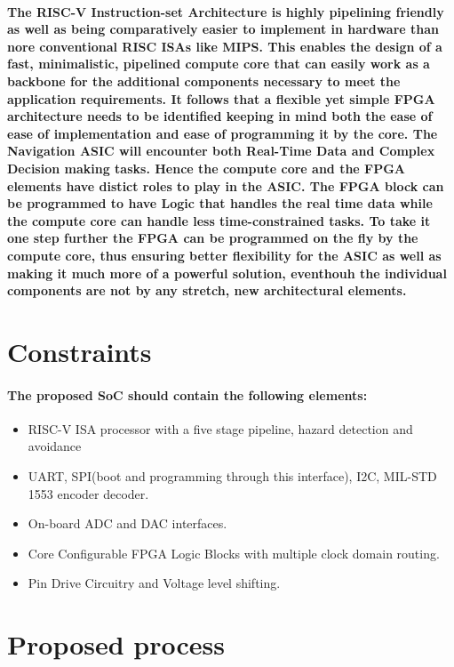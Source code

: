 \documentclass[12pt,a4paper]{report}
\begin{document}
\paragraph{\textrm{\textmd{
			The RISC-V Instruction-set Architecture is highly pipelining friendly as well as being comparatively easier to implement in hardware than nore conventional RISC ISAs like MIPS. This enables the design of a fast, minimalistic, pipelined compute core that can easily work as a backbone for the additional components necessary to meet the application requirements. It follows that a flexible yet simple FPGA architecture needs to be identified keeping in mind both the ease of ease of implementation and ease of programming it by the core. The Navigation ASIC will encounter both Real-Time Data and Complex Decision making tasks. Hence the compute core and the FPGA elements have distict roles to play in the ASIC. The FPGA block can be programmed to have Logic that handles the real time data while the compute core can handle less time-constrained tasks. To take it one step further the FPGA can be programmed on the fly by the compute core, thus ensuring better flexibility for the ASIC as well as making it much more of a powerful solution, eventhouh the individual components are not by any stretch, new architectural elements.}}}
\section{Constraints}
\paragraph{\textrm{\textmd{The proposed SoC should contain the following elements:}}}
\begin{itemize}
	\item RISC-V ISA processor with a five stage pipeline, hazard detection and avoidance
	\item UART, SPI(boot and programming through this interface), I2C, MIL-STD 1553 encoder decoder.
	\item On-board ADC and DAC interfaces. 
	\item Core Configurable FPGA Logic Blocks with multiple clock domain routing.
	\item Pin Drive Circuitry and Voltage level shifting.
\end{itemize}
\section{Proposed process}
\end{document}
